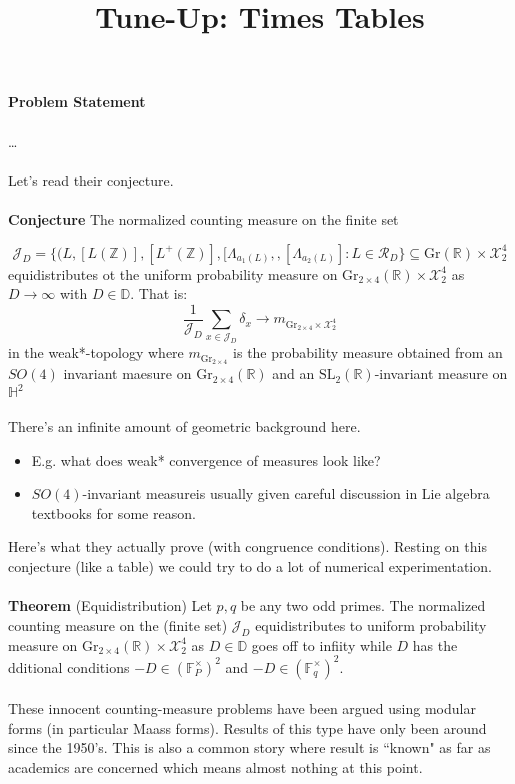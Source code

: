 \documentclass[12pt]{article}
\title{Tune-Up: Times Tables}
\date{}
\begin{document}
\sffamily

\maketitle

{\fontsize{16pt}{16pt}\selectfont 

\noindent  \textbf{Problem Statement} \\ \\
\dots  \\ \\
Let's read their conjecture.   \\ \\
\textbf{Conjecture} The normalized counting measure on the finite set}
$$ \mathcal{J}_D = 
\big\{ (L, [L(\mathbb{Z})], [L^+(\mathbb{Z})], [\Lambda_{a_1(L)},, [\Lambda_{a_2(L)}] : L \in \mathcal{R}_D \big\} \subseteq \text{Gr}(\mathbb{R}) \times \mathcal{X}_2^4 $$
equidistributes ot the uniform probability measure on $\text{Gr}_{2 \times 4} (\mathbb{R}) \times \mathcal{X}_2^4$ as $D \to \infty$ with $D \in \mathbb{D}$.  That is:
$$ 
\frac{1}{\mathcal{J}_D}
\sum_{x \in \mathcal{J}_D}
\delta_x \to m_{\text{Gr}_{2 \times 4} \times \mathcal{X}_2^4}  
$$ 
in the weak*-topology where $m_{\text{Gr}_{2 \times 4}}$ is the probability measure obtained from an $SO(4)$ invariant maesure on $\text{Gr}_{2 \times 4}(\mathbb{R})$ and an 
$\text{SL}_2(\mathbb{R})$-invariant measure on $\mathbb{H}^2$ \\ \\
There's an infinite amount of geometric background here.
\begin{itemize}
	\item E.g. what does weak* convergence of measures look like?
	\item $SO(4)$-invariant measureis usually given careful discussion in Lie algebra textbooks for some reason.
\end{itemize}
Here's what they actually prove (with congruence conditions).  Resting on this conjecture (like a table) we could try to do a lot of numerical experimentation. \\ \\
\textbf{Theorem} (Equidistribution) Let $p,q$ be any two odd primes.  The normalized counting measure on the (finite set) $\mathcal{J}_D$ equidistributes to uniform probability measure on 
$ \text{Gr}_{2 \times 4} (\mathbb{R}) \times \mathcal{X}_2^4$ 
as $D \in \mathbb{D}$ goes off to infiity while $D$ has the dditional conditions $-D \in (\mathbb{F}_P^\times)^2$ and $-D \in (\mathbb{F}_q^\times)^2$.  \\ \\
These innocent counting-measure problems have been argued using modular forms (in particular Maass forms).  Results of this type have only been around since the 1950's.   This is also a common story where result is ``known" as far as academics are concerned which means almost nothing at this point.
\vfill
\end{document}

